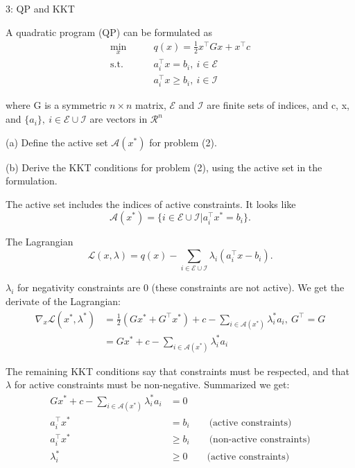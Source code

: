 
\begin{problem}{3: QP and KKT}

  A quadratic program (QP) can be formulated as
  \begin{align*}
    \min_x  \qquad& q(x) = \frac{1}{2}x^{\top}Gx+x^{\top}c \\ 
    \text{s.t.}\qquad & a_i^{\top}x = b_i,\  i\in \mathcal{E} \\ 
    &a_i^{\top} x\geq b_i,\  i\in \mathcal{I}
  \end{align*}

  where G is a symmetric $n\times n$ matrix, $\mathcal{E}$ and $\mathcal{I}$ are finite sets 
  of indices, and c, x, and $\{a_i\},\  i\in \mathcal{E}\cup\mathcal{I}$ are vectors in $\mathcal{R}^{n}$ 

  \medskip (a) Define the active set $\mathcal{A}(x^*)$ for problem (2).
  
  \medskip (b) Derive the KKT conditions for problem (2), using the active set in the formulation.

\end{problem}



The active set includes the indices of active constraints. It looks like
\[
  \mathcal{A}(x^*) = \{i\in \mathcal{E} \cup \mathcal{I} | a_i^{\top}x^* = b_i\}
.\] 


The Lagrangian
\[
  \mathcal{L}(x, \lambda) = q(x) - \sum_{i\in \mathcal{E} \cup \mathcal{I}}\lambda_i (a_i^{\top}x - b_i)
.\] 

$\lambda_i$ for negativity constraints are 0 (these constraints are not active). We get the derivate of the Lagrangian:
\begin{align*}
  \nabla_x \mathcal{L}(x^*, \lambda^*) &= \frac{1}{2}(Gx^* + G^{\top}x^*) + c - \sum_{i \in\mathcal{A}(x^*)}\lambda_i^*a_i ,\ G^{\top} = G \\ 
  &= Gx^* + c - \sum_{i \in\mathcal{A}(x^*)} \lambda_i^*a_i
\end{align*}

The remaining KKT conditions say that constraints must be respected, and that $\lambda$ for active constraints must be non-negative. Summarized we get:
\begin{align*}
  Gx^* + c - \sum_{i\in \mathcal{A}(x^*)} \lambda_i^*a_i &= 0 \\ 
  a_i^{\top}x^* &= b_i \qquad\text{(active constraints)}  \\ 
  a_i^{\top}x^* &\geq b_i \qquad\text{(non-active constraints)} \\ 
  \lambda_i^* &\geq 0\qquad\text{(active constraints)}
\end{align*}